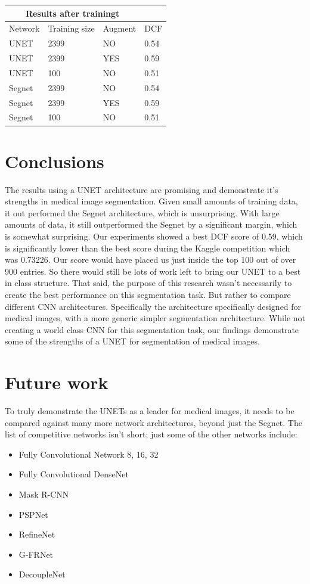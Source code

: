 \documentclass[letterpaper]{article}
\begin{document}
\begin{tabular}{ |p{1.5cm}||p{2cm}|p{1.5cm}|p{1cm}|  }
 \hline
 \multicolumn{3}{|c|}{Results after trainingt} \\
 \hline
Network    & Training size & Augment & DCF \\
 \hline
 UNET   & 2399    & NO & 0.54\\
 UNET   & 2399    & YES & 0.59\\
 UNET   & 100    & NO & 0.51\\ 
 Segnet   & 2399    & NO & 0.54\\
 Segnet   & 2399    & YES & 0.59\\
 Segnet   & 100    & NO & 0.51\\ 
 \hline
\end{tabular}



\section{Conclusions}
The results using a UNET architecture are promising and demonstrate it's strengths in medical image segmentation. Given small amounts of training data, it out performed the Segnet architecture, which is unsurprising. With large amounts of data, it still outperformed the Segnet by a significant margin, which is somewhat surprising. Our experiments showed a best DCF score of 0.59, which is significantly lower than the best score during the Kaggle competition which was 0.73226. Our score would have placed us just inside the top 100 out of over 900 entries. So there would still be lots of work left to bring our UNET to a best in class structure. That said, the purpose of this research wasn't necessarily to create the best performance on this segmentation task. But rather to compare different CNN architectures. Specifically the architecture specifically designed for medical images, with a more generic simpler segmentation architecture. While not creating a world class CNN for this segmentation task, our findings demonstrate some of the strengths of a UNET for segmentation of medical images. 


\section{Future work}
To truly demonstrate the UNETs as a leader for medical images, it needs to be compared against many more network architectures, beyond just the Segnet. The list of competitive networks isn't short; just some of the other networks include:
\begin{itemize}
  \item Fully Convolutional Network 8, 16, 32
  \item Fully Convolutional DenseNet
  \item Mask R-CNN
  \item PSPNet
  \item RefineNet
  \item G-FRNet
  \item DecoupleNet
  
  
\end{itemize}
\end{document}
